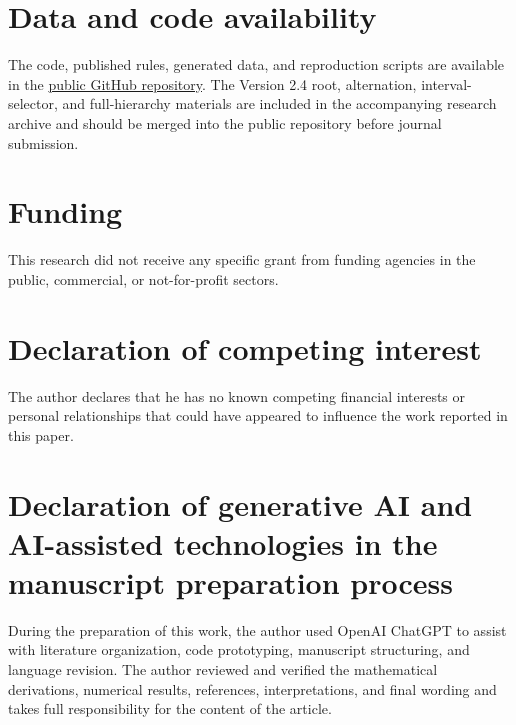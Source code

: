 \documentclass[preprint,12pt]{elsarticle}
\theoremstyle{remark}
\begin{document}
\section*{Data and code availability}

The code, published rules, generated data, and reproduction scripts are
available in the
\href{https://github.com/TurkeyOp/partial-moment-stieltjes-quadrature}{public GitHub repository}.
The Version 2.4 root, alternation, interval-selector, and full-hierarchy materials are included in the
accompanying research archive and should be merged into the public
repository before journal submission.

\section*{Funding}

This research did not receive any specific grant from funding agencies
in the public, commercial, or not-for-profit sectors.

\section*{Declaration of competing interest}

The author declares that he has no known competing financial interests
or personal relationships that could have appeared to influence the
work reported in this paper.

\section*{Declaration of generative AI and AI-assisted technologies in
the manuscript preparation process}

During the preparation of this work, the author used OpenAI ChatGPT to
assist with literature organization, code prototyping, manuscript
structuring, and language revision. The author reviewed and verified
the mathematical derivations, numerical results, references,
interpretations, and final wording and takes full responsibility for
the content of the article.
\end{document}
